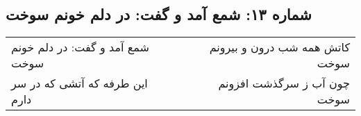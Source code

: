 \begin{center}
\section*{شماره ۱۳: شمع آمد و گفت: در دلم خونم سوخت}
\label{sec:013}
\begin{longtable}{l p{0.5cm} r}
شمع آمد و گفت: در دلم خونم سوخت
&&
کاتش همه شب درون و بیرونم سوخت
\\
این طرفه که آتشی که در سر دارم
&&
چون آب ز سرگذشت افزونم سوخت
\\
\end{longtable}
\end{center}
